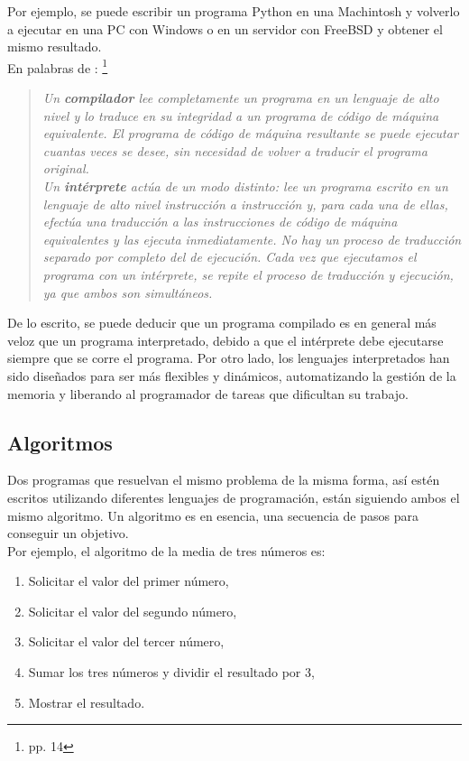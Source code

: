 Por ejemplo, se puede escribir un programa Python en una Machintosh y volverlo a ejecutar en una PC con Windows o en un servidor con FreeBSD y obtener el mismo resultado.\\

En palabras de \cite{Marzal2003}: \footnote{\cite{Marzal2003} pp. 14}

\begin{quotation}
\textit{Un \textbf{compilador} lee completamente un programa en un lenguaje de alto nivel y lo traduce en su integridad a un programa de código de máquina equivalente. El programa de código de máquina resultante se puede ejecutar cuantas veces se desee, sin necesidad de volver a traducir el programa original.}\\

\textit{Un \textbf{intérprete} actúa de un modo distinto: lee un programa escrito en un lenguaje de alto nivel instrucción a instrucción y, para cada una de ellas, efectúa una traducción a las instrucciones de código de máquina equivalentes y las ejecuta inmediatamente. No hay un proceso de traducción separado por completo del de ejecución. Cada vez que ejecutamos el programa con un intérprete, se repite el proceso de traducción y ejecución, ya que ambos son simultáneos.}
\end{quotation}

De lo escrito, se puede deducir que un programa compilado es en general más veloz que un programa interpretado, debido a que el intérprete debe ejecutarse siempre que se corre el programa. Por otro lado, los lenguajes interpretados han sido diseñados para ser más flexibles y dinámicos, automatizando la gestión de la memoria y liberando al programador de tareas que dificultan su trabajo.

\subsection{Algoritmos}

Dos programas que resuelvan el mismo problema de la misma forma, así estén escritos utilizando diferentes lenguajes de programación, están siguiendo ambos el mismo algoritmo. Un algoritmo es en esencia, una secuencia de pasos para conseguir un objetivo.\\

Por ejemplo, el algoritmo de la media de tres números es:

\begin{enumerate}
\item Solicitar el valor del primer número,
\item Solicitar el valor del segundo número,
\item Solicitar el valor del tercer número,
\item Sumar los tres números y dividir el resultado por 3,
\item Mostrar el resultado.
\end{enumerate}


